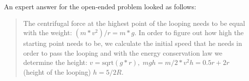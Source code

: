 \documentclass[D:/studies/WinnerS/Erhebungen/IPhO1718/paper/problem_solving/main/TaylorFrancis/interactapasample]{subfiles}
\begin{document}
\begin{tcolorbox}


\end{tcolorbox}

An expert answer for the open-ended problem looked as follows: 
\begin{quote}
The centrifugal force at the highest point of the looping needs to be equal with the weight: $(m*v^2)/r=m*g$. In order to figure out how high the starting point needs to be, we calculate the initial speed that he needs in order to pass the looping and with the energy conservation law we determine the height: $v=\text{sqrt}(g*r), \; mgh=m/2*v^2 h=0.5r+2r$ (height of the looping) $h=5/2R$.

\end{quote}
\end{document}
